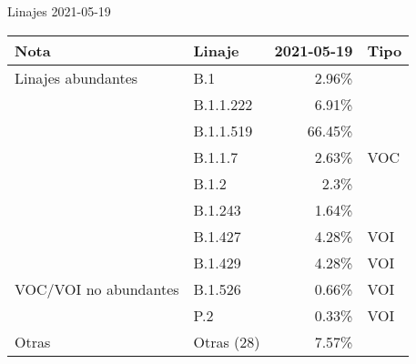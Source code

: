 \documentclass[12pt]{standalone}
\begin{document}
\bigskip
\centering
Linajes 2021-05-19
\begin{table}[ht]
\centering
\begin{tabular}{p{3cm}lrl}
  \toprule
{\textbf{Nota}} & {\textbf{Linaje}} & {\textbf{2021-05-19}} & {\textbf{Tipo}} \\ 
  \midrule
Linajes abundantes & B.1 & 2.96\% &  \\ 
   & B.1.1.222 & 6.91\% &  \\ 
   & B.1.1.519 & 66.45\% &  \\ 
   & B.1.1.7 & 2.63\% & VOC \\ 
   & B.1.2 & 2.3\% &  \\ 
   & B.1.243 & 1.64\% &  \\ 
   & B.1.427 & 4.28\% & VOI \\ 
   & B.1.429 & 4.28\% & VOI \\ 
   \midrule
VOC/VOI no abundantes & B.1.526 & 0.66\% & VOI \\ 
   & P.2 & 0.33\% & VOI \\ 
   \midrule
Otras & Otras (28) & 7.57\% &  \\ 
   \bottomrule
\end{tabular}
\end{table}

\bigskip
\endminipage
\end{document}
